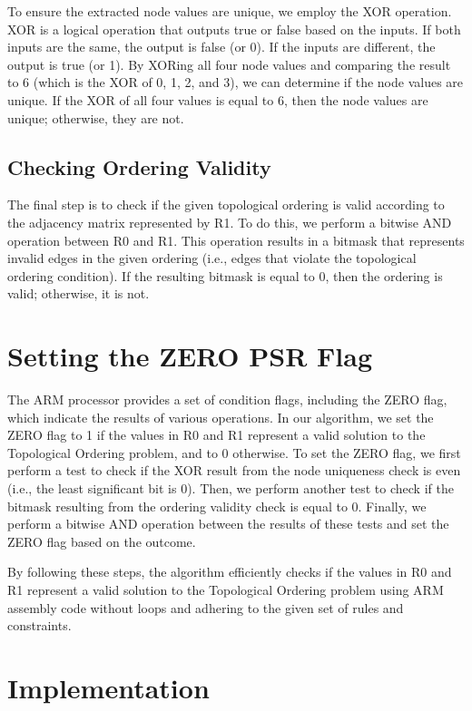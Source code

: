 To ensure the extracted node values are unique, we employ the XOR operation. XOR is a logical operation that outputs true or false based on the inputs. If both inputs are the same, the output is false (or 0). If the inputs are different, the output is true (or 1). By XORing all four node values and comparing the result to 6 (which is the XOR of 0, 1, 2, and 3), we can determine if the node values are unique. If the XOR of all four values is equal to 6, then the node values are unique; otherwise, they are not.

\subsection{Checking Ordering Validity}

The final step is to check if the given topological ordering is valid according to the adjacency matrix represented by R1. To do this, we perform a bitwise AND operation between R0 and R1. This operation results in a bitmask that represents invalid edges in the given ordering (i.e., edges that violate the topological ordering condition). If the resulting bitmask is equal to 0, then the ordering is valid; otherwise, it is not.

\section{Setting the ZERO PSR Flag}

The ARM processor provides a set of condition flags, including the ZERO flag, which indicate the results of various operations. In our algorithm, we set the ZERO flag to 1 if the values in R0 and R1 represent a valid solution to the Topological Ordering problem, and to 0 otherwise. To set the ZERO flag, we first perform a test to check if the XOR result from the node uniqueness check is even (i.e., the least significant bit is 0). Then, we perform another test to check if the bitmask resulting from the ordering validity check is equal to 0. Finally, we perform a bitwise AND operation between the results of these tests and set the ZERO flag based on the outcome.

By following these steps, the algorithm efficiently checks if the values in R0 and R1 represent a valid solution to the Topological Ordering problem using ARM assembly code without loops and adhering to the given set of rules and constraints.



\section{Implementation}

